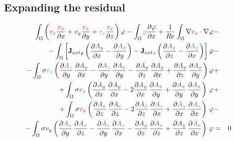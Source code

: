 \documentclass[smallextended]{svjour3}       %
\begin{document}
		\subsection{Expanding the residual}
		\begin{eqnarray}
			\int_{\Omega} \left(\textcolor{red}{v_x} \frac{\textcolor{red}{v_x}}{\partial x} + \textcolor{blue}{v_y} \frac{\textcolor{red}{v_x}}{\partial y} + \textcolor{green}{v_z} \frac{\textcolor{red}{v_x}}{\partial z}\right) \varphi
			- \int_{\Omega} \textcolor{orange}{p} \frac{\partial \varphi}{\partial x}
			+ \frac{1}{Re} \int_{\Omega} \nabla \textcolor{red}{v_x} \cdot \nabla \varphi
			\nonumber & -\\
			- \int_{\Omega} \left[{\mathbf{J}_{ext}}_y \left(\frac{\partial \textcolor{darkBlue}{A_y}}{\partial x} - \frac{\partial \textcolor{darkRed}{A_x}}{\partial y}\right) - {\mathbf{J}_{ext}}_z \left(\frac{\partial \textcolor{darkRed}{A_x}}{\partial z} - \frac{\partial \textcolor{darkGreen}{A_z}}{\partial x}\right)\right] \varphi			
			\nonumber & -\\
			- \int_{\Omega} \sigma \textcolor{green}{v_z} \left(\frac{\partial \textcolor{darkGreen}{A_z}}{\partial y}\,\frac{\partial \textcolor{darkBlue}{A_y}}{\partial x} - \frac{\partial \textcolor{darkGreen}{A_z}}{\partial y}\,\frac{\partial \textcolor{darkRed}{A_x}}{\partial y} - \frac{\partial \textcolor{darkBlue}{A_y}}{\partial z}\,\frac{\partial \textcolor{darkBlue}{A_y}}{\partial x} + \frac{\partial \textcolor{darkBlue}{A_y}}{\partial z}\,\frac{\partial \textcolor{darkRed}{A_x}}{\partial y} \right) \varphi& +\nonumber \\			
			+ \int_{\Omega} \sigma \textcolor{red}{v_x} \left(\frac{\partial \textcolor{darkBlue}{A_y}}{\partial x}\,\frac{\partial \textcolor{darkBlue}{A_y}}{\partial x} - 2 \frac{\partial \textcolor{darkBlue}{A_y}}{\partial x}\,\frac{\partial \textcolor{darkRed}{A_x}}{\partial y} + \frac{\partial \textcolor{darkRed}{A_x}}{\partial y}\,\frac{\partial \textcolor{darkRed}{A_x}}{\partial y} \right)\, \varphi& +\nonumber \\			
			+ \int_{\Omega} \sigma \textcolor{red}{v_x} \left(\frac{\partial \textcolor{darkRed}{A_x}}{\partial z}\,\frac{\partial \textcolor{darkRed}{A_x}}{\partial z} - 2 \frac{\partial \textcolor{darkRed}{A_x}}{\partial z}\,\frac{\partial \textcolor{darkGreen}{A_z}}{\partial x} + \frac{\partial \textcolor{darkGreen}{A_z}}{\partial x}\,\frac{\partial \textcolor{darkGreen}{A_z}}{\partial x} \right)\, \varphi& -\nonumber \\			
			- \int_{\Omega} \sigma \textcolor{blue}{v_y} \left(\frac{\partial \textcolor{darkGreen}{A_z}}{\partial y}\,\frac{\partial \textcolor{darkRed}{A_x}}{\partial z} - \frac{\partial \textcolor{darkGreen}{A_z}}{\partial y}\,\frac{\partial \textcolor{darkGreen}{A_z}}{\partial x} - \frac{\partial \textcolor{darkBlue}{A_y}}{\partial z}\,\frac{\partial \textcolor{darkRed}{A_x}}{\partial z}  + \frac{\partial \textcolor{darkBlue}{A_y}}{\partial z}\,\frac{\partial \textcolor{darkGreen}{A_z}}{\partial x} \right)\, \varphi& = & 0 \\			

\end{eqnarray}
\end{document}
